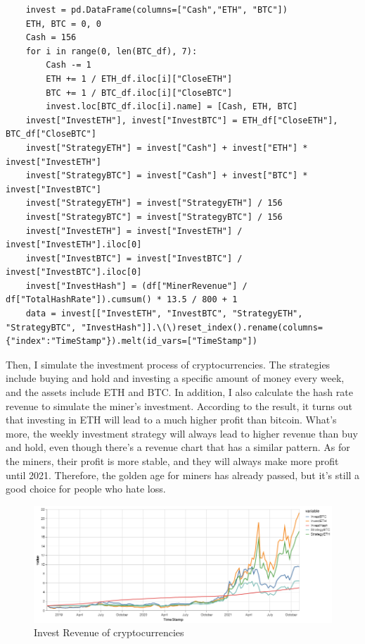 \documentclass[a4paper]{article}
\begin{document}
\begin{verbatim}
    invest = pd.DataFrame(columns=["Cash","ETH", "BTC"])
    ETH, BTC = 0, 0
    Cash = 156
    for i in range(0, len(BTC_df), 7):
        Cash -= 1
        ETH += 1 / ETH_df.iloc[i]["CloseETH"]
        BTC += 1 / BTC_df.iloc[i]["CloseBTC"]
        invest.loc[BTC_df.iloc[i].name] = [Cash, ETH, BTC]
    invest["InvestETH"], invest["InvestBTC"] = ETH_df["CloseETH"], BTC_df["CloseBTC"]
    invest["StrategyETH"] = invest["Cash"] + invest["ETH"] * invest["InvestETH"]
    invest["StrategyBTC"] = invest["Cash"] + invest["BTC"] * invest["InvestBTC"]
    invest["StrategyETH"] = invest["StrategyETH"] / 156 
    invest["StrategyBTC"] = invest["StrategyBTC"] / 156 
    invest["InvestETH"] = invest["InvestETH"] / invest["InvestETH"].iloc[0] 
    invest["InvestBTC"] = invest["InvestBTC"] / invest["InvestBTC"].iloc[0]
    invest["InvestHash"] = (df["MinerRevenue"] / df["TotalHashRate"]).cumsum() * 13.5 / 800 + 1
    data = invest[["InvestETH", "InvestBTC", "StrategyETH", "StrategyBTC", "InvestHash"]].\(\)reset_index().rename(columns={"index":"TimeStamp"}).melt(id_vars=["TimeStamp"])
\end{verbatim}
Then, I simulate the investment process of cryptocurrencies. The strategies include buying and hold and investing a specific amount of money every week, and the assets include ETH and BTC. In addition, I also calculate the hash rate revenue to simulate the miner's investment. According to the result, it turns out that investing in ETH will lead to a much higher profit than bitcoin. What's more, the weekly investment strategy will always lead to higher revenue than buy and hold, even though there's a revenue chart that has a similar pattern.
As for the miners, their profit is more stable, and they will always make more profit until 2021. Therefore, the golden age for miners has already passed, but it's still a good choice for people who hate loss.
\begin{figure}[H]
    \centering
    \includegraphics[scale=0.5]{Investment.png}
    \caption{Invest Revenue of cryptocurrencies}
\end{figure}
\end{document}
